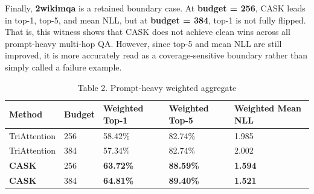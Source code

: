 Finally, \textbf{2wikimqa} is a retained boundary case. At \textbf{budget = 256}, CASK leads in top-1, top-5, and mean NLL, but at \textbf{budget = 384}, top-1 is not fully flipped. That is, this witness shows that CASK does not achieve clean wins across all prompt-heavy multi-hop QA. However, since top-5 and mean NLL are still improved, it is more accurately read as a coverage-sensitive boundary rather than simply called a failure example.



\begin{table}[H]
\centering
\small
\caption{Table 2. Prompt-heavy weighted aggregate}
\begin{tabularx}{\textwidth}{YYYYY}
\toprule
Method & Budget & Weighted Top-1 & Weighted Top-5 & Weighted Mean NLL \\
\midrule
TriAttention & 256 & 58.42\% & 82.74\% & 1.985 \\
TriAttention & 384 & 57.34\% & 82.74\% & 2.002 \\
\textbf{CASK} & 256 & \textbf{63.72\%} & \textbf{88.59\%} & \textbf{1.594} \\
\textbf{CASK} & 384 & \textbf{64.81\%} & \textbf{89.40\%} & \textbf{1.521} \\
\bottomrule
\end{tabularx}
\end{table}



